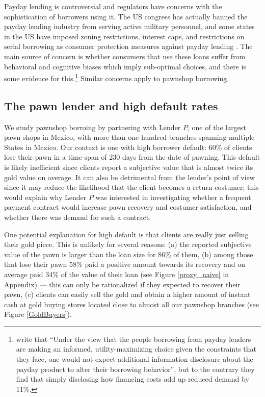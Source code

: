 \documentclass[oneside,11pt]{article}
\begin{document}
Payday lending is controversial and regulators have concerns with the sophistication of borrowers using it. The US congress has actually banned the payday lending industry from serving active military personnel, and some states in the US have imposed zoning restrictions, interest caps, and restrictions on serial borrowing as consumer protection measures against payday lending \citep{Payday}. The main source of concern is whether consumers that use these loans suffer from behavioral and cognitive biases which imply sub-optimal choices, and there is some evidence for this.\footnote{\cite{Bertrand} write that ``Under the view that the people borrowing from payday lenders are making an informed, utility-maximizing choice given the constraints that they face, one  would not expect additional information disclosure about the payday product to  alter their borrowing behavior'', but to the contrary they find that simply disclosing how financing costs add up reduced demand by 11\%. %
} Similar concerns apply to pawnshop borrowing.


\subsection{The pawn lender and high default rates}


We study pawnshop borroing by partnering with Lender $P$, one of the largest pawn shops in Mexico, with more than one hundred branches spanning multiple States in Mexico.  Our context is one with high borrower default: 60\% of clients lose their pawn in a time span of 230 days from the date of pawning. This default is likely inefficient since clients report a subjective value that is almost twice its gold value on average. It can also be detrimental from the lender's point of view since it may reduce the likelihood that the client becomes a return costumer; this would explain why Lender $P$ was interested in investigating whether a frequent payment contract would increase pawn recovery and costumer satisfaction, and whether there was demand for such a contract. 

One potential explanation for high default is that clients are really just selling their gold piece. This is unlikely for several reasons: (a) the reported subjective value of the pawn is larger than the loan size for 86\% of them, (b) among those that lose their pawn 58\% paid a positive amount towards its recovery and on average paid 34\% of the value of their loan (see Figure \ref{proxy_naive} in Appendix) --- this can only be rationalized if they expected to recover their pawn, (c) clients can easily sell the gold and obtain a higher amount of instant cash at gold buying stores located close to almost all our pawnshop branches (see Figure \ref{GoldBuyers}). %
\end{document}
